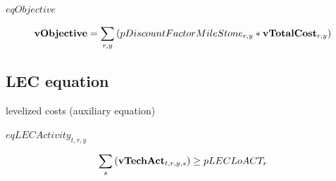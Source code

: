 \documentclass{article}
\begin{document}
$eqObjective$





\begin{dmath}
{\bf vObjective}  =  \sum_{r,y}{\left(pDiscountFactorMileStone_{r,y}*{\bf vTotalCost}_{r,y}\right)}
\end{dmath}
\subsection*{LEC equation}
levelized costs (auxiliary equation)







$eqLECActivity_{t,r,y}$





\begin{dmath}
\sum_{s}{\left({\bf vTechAct}_{t,r,y,s}\right)}  \ge  pLECLoACT_{r}
\end{dmath}
\end{document}
